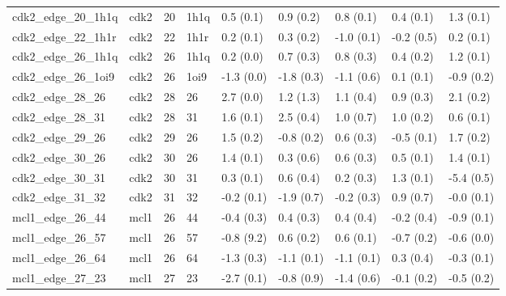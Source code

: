 \begin{tabular}{lllllllll}
cdk2\_edge\_20\_1h1q                &      cdk2 &          20 &        1h1q &   0.5 (0.1) &         0.9 (0.2) &   0.8 (0.1) &   0.4 (0.1) &   1.3 (0.1) \\
cdk2\_edge\_22\_1h1r                &      cdk2 &          22 &        1h1r &   0.2 (0.1) &         0.3 (0.2) &  -1.0 (0.1) &  -0.2 (0.5) &   0.2 (0.1) \\
cdk2\_edge\_26\_1h1q                &      cdk2 &          26 &        1h1q &   0.2 (0.0) &         0.7 (0.3) &   0.8 (0.3) &   0.4 (0.2) &   1.2 (0.1) \\
cdk2\_edge\_26\_1oi9                &      cdk2 &          26 &        1oi9 &  -1.3 (0.0) &        -1.8 (0.3) &  -1.1 (0.6) &   0.1 (0.1) &  -0.9 (0.2) \\
cdk2\_edge\_28\_26                  &      cdk2 &          28 &          26 &   2.7 (0.0) &         1.2 (1.3) &   1.1 (0.4) &   0.9 (0.3) &   2.1 (0.2) \\
cdk2\_edge\_28\_31                  &      cdk2 &          28 &          31 &   1.6 (0.1) &         2.5 (0.4) &   1.0 (0.7) &   1.0 (0.2) &   0.6 (0.1) \\
cdk2\_edge\_29\_26                  &      cdk2 &          29 &          26 &   1.5 (0.2) &        -0.8 (0.2) &   0.6 (0.3) &  -0.5 (0.1) &   1.7 (0.2) \\
cdk2\_edge\_30\_26                  &      cdk2 &          30 &          26 &   1.4 (0.1) &         0.3 (0.6) &   0.6 (0.3) &   0.5 (0.1) &   1.4 (0.1) \\
cdk2\_edge\_30\_31                  &      cdk2 &          30 &          31 &   0.3 (0.1) &         0.6 (0.4) &   0.2 (0.3) &   1.3 (0.1) &  -5.4 (0.5) \\
cdk2\_edge\_31\_32                  &      cdk2 &          31 &          32 &  -0.2 (0.1) &        -1.9 (0.7) &  -0.2 (0.3) &   0.9 (0.7) &  -0.0 (0.1) \\
mcl1\_edge\_26\_44                  &      mcl1 &          26 &          44 &  -0.4 (0.3) &         0.4 (0.3) &   0.4 (0.4) &  -0.2 (0.4) &  -0.9 (0.1) \\
mcl1\_edge\_26\_57                  &      mcl1 &          26 &          57 &  -0.8 (9.2) &         0.6 (0.2) &   0.6 (0.1) &  -0.7 (0.2) &  -0.6 (0.0) \\
mcl1\_edge\_26\_64                  &      mcl1 &          26 &          64 &  -1.3 (0.3) &        -1.1 (0.1) &  -1.1 (0.1) &   0.3 (0.4) &  -0.3 (0.1) \\
mcl1\_edge\_27\_23                  &      mcl1 &          27 &          23 &  -2.7 (0.1) &        -0.8 (0.9) &  -1.4 (0.6) &  -0.1 (0.2) &  -0.5 (0.2) \\

\end{tabular}
